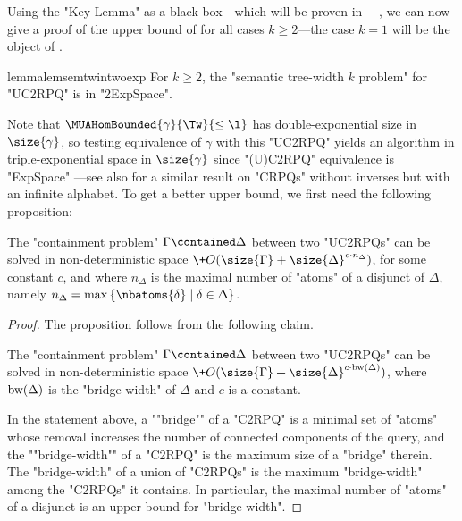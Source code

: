 Using the "Key Lemma" as a black box---which will be proven in ---, we can now give a proof of the upper bound of  for all
cases $k\geq 2$---the case $k=1$ will be the object of .
\begin{restatable}{lemma}{lemsemtwintwoexp}
    \AP\label{lem:sem-tw-in-twoexp}
    For $k \geq 2$, the "semantic tree-width $k$ problem" for "UC2RPQ" is in "2ExpSpace".
\end{restatable}
Note that $\MUAHomBounded{\gamma}{\Tw}{\leq\l}$ has double-exponential size in $\size{\gamma}$,
so testing equivalence of $\gamma$ with this "UC2RPQ" yields an algorithm in triple-exponential 
space in $\size{\gamma}$ since "(U)C2RPQ" equivalence is "ExpSpace" \cite[Theorem 5]{CalvaneseDeGiacomoLenzeriniVardi2000Containment}
---see also \cite[§ after Theorem 4.8]{FlorescuLevySuciu1998Containment} for a similar result on "CRPQs" without 
inverses but with an infinite alphabet. To get a better upper bound, we first need
the following proposition:
\begin{proposition}
	\AP\label{prop:bound-containment-pb}
    The "containment problem" $\Gamma \contained \Delta$ between two "UC2RPQs" can be solved in non-deterministic space $\+O(\size{\Gamma} + \size{\Delta}^{c \cdot {n_\Delta}})$, for some constant $c$,
	and where $n_\Delta$ is the maximal number of "atoms" of a disjunct of $\Delta$, namely $n_\Delta = \max{\{\nbatoms{\delta} \mid \delta \in \Delta\}}$. 
\end{proposition}

\begin{proof}
	The proposition follows from the following claim.
    \begin{claim}
        The "containment problem" $\Gamma \contained \Delta$ between two "UC2RPQs" can be solved in non-deterministic space $\+O(\size{\Gamma} + {\size{\Delta}}^{c \cdot \bw(\Delta)})$, where $\textrm{bw}(\Delta)$ is the "bridge-width" of $\Delta$ and $c$ is a constant.
    \end{claim}
    \AP
    In the statement above, a ""bridge"" of a "C2RPQ" is a minimal set of "atoms" whose removal increases the number of connected components of the query, and the ""bridge-width"" of a "C2RPQ" is the maximum size of a "bridge" therein. The "bridge-width" of a union of "C2RPQs" is the maximum "bridge-width" among the "C2RPQs" it contains. In particular, the maximal number
	of "atoms" of a disjunct is an upper bound for "bridge-width".
\end{proof}

